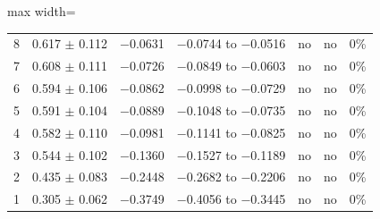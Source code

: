 \begin{table}[t]
\begin{adjustbox}{max width=\textwidth}
\begin{tabular}{rcccccc}
8 & 0.617 $\pm$ 0.112 & $-$0.0631 & $-$0.0744 to $-$0.0516 & no & no & 0\% \\
7 & 0.608 $\pm$ 0.111 & $-$0.0726 & $-$0.0849 to $-$0.0603 & no & no & 0\% \\
6 & 0.594 $\pm$ 0.106 & $-$0.0862 & $-$0.0998 to $-$0.0729 & no & no & 0\% \\
5 & 0.591 $\pm$ 0.104 & $-$0.0889 & $-$0.1048 to $-$0.0735 & no & no & 0\% \\
4 & 0.582 $\pm$ 0.110 & $-$0.0981 & $-$0.1141 to $-$0.0825 & no & no & 0\% \\
3 & 0.544 $\pm$ 0.102 & $-$0.1360 & $-$0.1527 to $-$0.1189 & no & no & 0\% \\
2 & 0.435 $\pm$ 0.083 & $-$0.2448 & $-$0.2682 to $-$0.2206 & no & no & 0\% \\
1 & 0.305 $\pm$ 0.062 & $-$0.3749 & $-$0.4056 to $-$0.3445 & no & no & 0\% \\
\bottomrule
\end{tabular}
\end{adjustbox}
\par\smallskip\parbox{0.95\linewidth}{\footnotesize {}}
\end{table}
